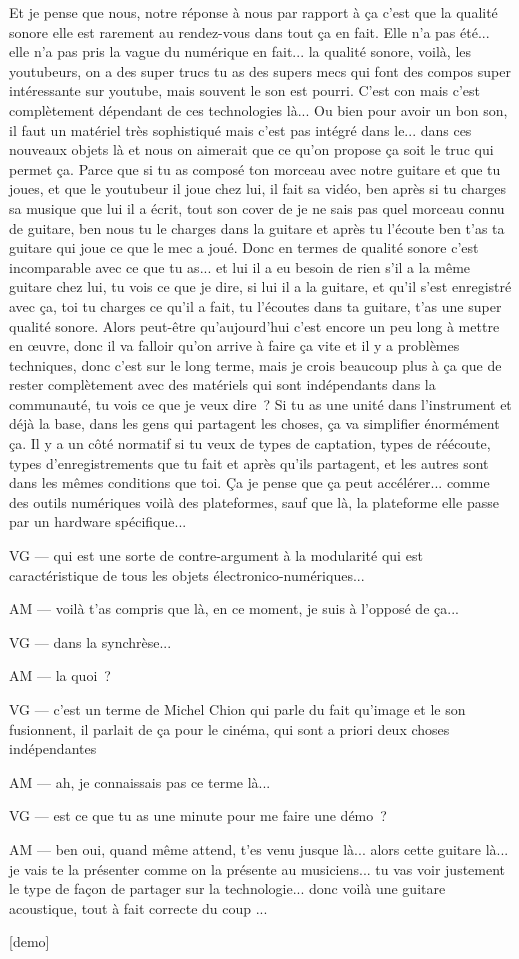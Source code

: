 Et je pense que nous, notre réponse à nous par rapport à ça c'est que la qualité sonore elle est rarement au rendez-vous dans tout ça en fait. Elle n'a pas été... elle n'a pas pris la vague du numérique en fait... la qualité sonore, voilà, les youtubeurs, on a des super trucs tu as des supers mecs qui font des compos super intéressante sur youtube, mais souvent le son est pourri. C'est con mais c'est complètement dépendant de ces technologies là... Ou bien pour avoir un bon son, il faut un matériel très sophistiqué mais c'est pas intégré dans le... dans ces nouveaux objets là et nous on aimerait que ce qu'on propose ça soit le truc qui permet ça. Parce que si tu as composé ton morceau avec notre guitare et que tu joues, et que le youtubeur il joue chez lui, il fait sa vidéo, ben après si tu charges sa musique que lui il a écrit, tout son cover de je ne sais pas quel morceau connu de guitare, ben nous tu le charges dans la guitare et après tu l'écoute ben t'as ta guitare qui joue ce que le mec a joué. Donc en termes de qualité sonore c'est incomparable avec ce que tu as... et lui il a eu besoin de rien s'il a la même guitare chez lui, tu vois ce que je dire, si lui il a la guitare, et qu'il s'est enregistré avec ça, toi tu charges ce qu'il a fait, tu l'écoutes dans ta guitare, t'as une super qualité sonore. Alors peut-être qu'aujourd'hui c'est encore un peu long à mettre en œuvre, donc il va falloir qu'on arrive à faire ça vite et il y a problèmes techniques, donc c'est sur le long terme, mais je crois beaucoup plus à ça que de rester complètement avec des matériels qui sont indépendants dans la communauté, tu vois ce que je veux dire ? Si tu as une unité dans l'instrument et déjà la base, dans les gens qui partagent les choses, ça va simplifier énormément ça. Il y a un côté normatif si tu veux de types de captation, types de réécoute, types d'enregistrements que tu fait et après qu'ils partagent, et les autres sont dans les mêmes conditions que toi. Ça je pense que ça peut accélérer... comme des outils numériques voilà des plateformes, sauf que là, la plateforme elle passe par un hardware spécifique... 

VG — qui est une sorte de contre-argument à la modularité qui est caractéristique de tous les objets électronico-numériques... 

AM — voilà t'as compris que là, en ce moment, je suis à l'opposé de ça... 

VG — dans la synchrèse... 

AM — la quoi ?

VG — c'est un terme de Michel Chion qui parle du fait qu'image et le son fusionnent, il parlait de ça pour le cinéma, qui sont a priori deux choses indépendantes

AM — ah, je connaissais pas ce terme là...

VG — est ce que tu as une minute pour me faire une démo ?

AM — ben oui, quand même attend, t'es venu jusque là... alors cette guitare là...  je vais te la présenter comme on la présente au musiciens... tu vas voir justement le type de façon de partager sur la technologie... donc voilà une guitare acoustique, tout à fait correcte du coup ... 

[demo] 
